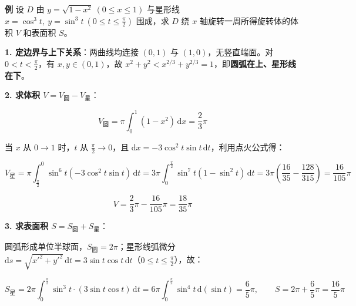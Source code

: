 \documentclass[11pt,a4paper]{ctexart}
\begin{document}

\textbf{例} 设 $D$ 由 $y=\sqrt{1-x^{2}}\ (0\le x\le 1)$ 与星形线 $x=\cos^{3}t,\ y=\sin^{3}t\ (0\le t\le\frac{\pi}{2})$ 围成，求 $D$ 绕 $x$ 轴旋转一周所得旋转体的体积 $V$ 和表面积 $S$。

\textbf{1. 定边界与上下关系}：两曲线均连接 $(0,1)$ 与 $(1,0)$，无竖直端面。对 $0<t<\frac{\pi}{2}$，有 $x,y\in(0,1)$，故 $x^{2}+y^{2} < x^{2/3}+y^{2/3}=1$，即\textbf{圆弧在上、星形线在下}。

\textbf{2. 求体积 $V = V_{\text{圆}} - V_{\text{星}}$}：

\[
V_{\text{圆}}=\pi\int_{0}^{1}(1-x^{2})\,\mathrm{d}x=\frac{2}{3}\pi
\]

当 $x$ 从 $0\to 1$ 时，$t$ 从 $\frac{\pi}{2}\to 0$，且 $\mathrm{d}x=-3\cos^{2}t\sin t\,\mathrm{d}t$，利用点火公式得：

\[
V_{\text{星}}=\pi\int_{\frac{\pi}{2}}^{0}\sin^{6}t(-3\cos^{2}t\sin t)\,\mathrm{d}t =3\pi\int_{0}^{\frac{\pi}{2}}\sin^{7}t(1-\sin^{2}t)\,\mathrm{d}t=3\pi\left(\frac{16}{35}-\frac{128}{315}\right)=\frac{16}{105}\pi
\]

\[
V = \frac{2}{3}\pi - \frac{16}{105}\pi = \frac{18}{35}\pi
\]

\textbf{3. 求表面积 $S = S_{\text{圆}} + S_{\text{星}}$}：

圆弧形成单位半球面，$S_{\text{圆}} = 2\pi$；星形线弧微分 $\mathrm{d}s=\sqrt{x'^{2}+y'^{2}}\,\mathrm{d}t=3\sin t\cos t\,\mathrm{d}t$（$0\le t\le\frac{\pi}{2}$），故：

\[
S_{\text{星}}=2\pi\int_{0}^{\frac{\pi}{2}}\sin^{3}t\cdot(3\sin t\cos t)\,\mathrm{d}t =6\pi\int_{0}^{\frac{\pi}{2}}\sin^{4}t\,\mathrm{d}(\sin t)=\frac{6}{5}\pi,\qquad S=2\pi+\frac{6}{5}\pi=\frac{16}{5}\pi
\]





\end{document}

